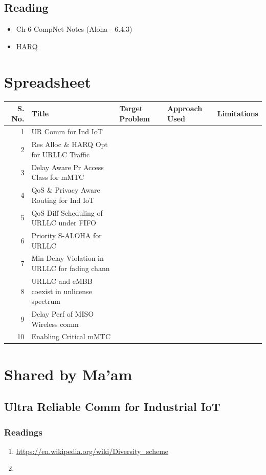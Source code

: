 \documentclass[11pt]{article}
\begin{document}
\subsection{Reading}
\label{sec:org17a926b}
\begin{itemize}
\item Ch-6 CompNet Notes (Aloha - 6.4.3)
\item \href{https://www.techplayon.com/hybrid-automatic-repeat-request-harq-in-lte-fdd/}{HARQ}
\end{itemize}
\section{Spreadsheet}
\label{sec:org1c78ff2}
\begin{center}
\begin{tabular}{rllll}
S. No. & Title & Target Problem & Approach Used & Limitations\\
\hline
1 & UR Comm for Ind IoT &  &  & \\
2 & Res Alloc \& HARQ Opt for URLLC Traffic &  &  & \\
3 & Delay Aware Pr Access Class for mMTC &  &  & \\
4 & QoS \& Privacy Aware Routing for Ind IoT &  &  & \\
5 & QoS Diff Scheduling of URLLC under FIFO &  &  & \\
6 & Priority S-ALOHA for URLLC &  &  & \\
7 & Min Delay Violation in URLLC for fading chann &  &  & \\
8 & URLLC and eMBB coexist in unlicense spectrum &  &  & \\
9 & Delay Perf of MISO Wireless comm &  &  & \\
10 & Enabling Critical mMTC &  &  & \\
\end{tabular}
\end{center}
\section{Shared by Ma'am}
\label{sec:org85ce98c}
\subsection{Ultra Reliable Comm for Industrial IoT}
\label{sec:org158aaff}
\subsubsection{Readings}
\label{sec:orgeccfea8}
\begin{enumerate}
\item \url{https://en.wikipedia.org/wiki/Diversity\_scheme}
\item 
\end{enumerate}
\end{document}
